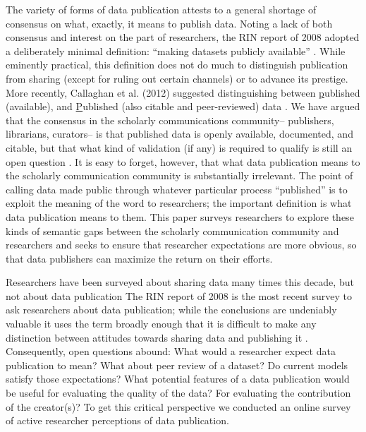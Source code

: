 \documentclass[10pt]{article}
\begin{document}
The variety of forms of data publication attests to a general shortage of consensus on what, exactly, it means to publish data.
Noting a lack of both consensus and interest on the part of researchers, the RIN report of 2008 adopted a deliberately minimal definition: ``making datasets publicly available'' \cite{swan_share_2008}.
While eminently practical, this definition does not do much to distinguish publication from sharing (except for ruling out certain channels) or to advance its prestige.
More recently, Callaghan et al. (2012) suggested distinguishing between \underline{p}ublished (available), and \underline{P}ublished (also citable and peer-reviewed) data \cite{callaghan_making_2012}.
We have argued that the consensus in the scholarly communications community-- publishers, librarians, curators-- is that published data is openly available, documented, and citable, but that what kind of validation (if any) is required to qualify is still an open question \cite{kratz_data_2014}.
It is easy to forget, however, that what data publication means to the scholarly communication community is substantially irrelevant.
The point of calling data made public through whatever particular process ``published'' is to exploit the meaning of the word to researchers; the important definition is what data publication means to them. 
This paper surveys researchers to explore these kinds of semantic gaps between the scholarly communication community and researchers and seeks to ensure that researcher expectations are more obvious, so that data publishers can maximize the return on their efforts.  

Researchers have been surveyed about sharing data many times this decade, but not about data publication \cite{harley_assessing_2010, westra_data_2010, tenopir_data_2011, kim_institutional_2012, scaramozzino_study_2012, williams_gathering_2013, bobrow_establishing_2014, strasser_dataup:_2014}
The RIN report of 2008 is the most recent survey to ask researchers about data publication; while the conclusions are undeniably valuable it uses the term broadly enough that it is difficult to make any distinction between attitudes towards sharing data and publishing it \cite{swan_share_2008}.
Consequently, open questions abound:
What would a researcher expect data publication to mean?
What about peer review of a dataset?
Do current models satisfy those expectations?
What potential features of a data publication would be useful for evaluating the quality of the data?
For evaluating the contribution of the creator(s)?
To get this critical perspective we conducted an online survey of active researcher perceptions of data publication.
\end{document}
